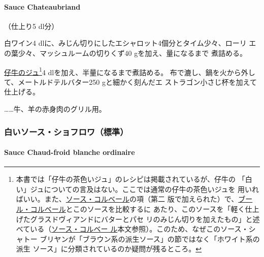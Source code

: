 \begin{recette}
\hypertarget{sauce-chateaubriand}{%
\paragraph{Sauce Chateaubriand}\label{sauce-chateaubriand}}


（仕上り5 dl分）

白ワイン4 dlに、みじん切りにしたエシャロット4個分とタイム少々、ローリ
エの葉少々、マッシュルームの切りくず40 gを加え、\untiers{}量になるまで
煮詰める。

\protect\hyperlink{jus-de-veau-brun}{仔牛のジュ}\footnote{本書では「仔牛の茶色いジュ」のレシピは掲載されているが、仔牛の
  「白い」ジュについての言及はない。ここでは通常の仔牛の茶色いジュを
  用いればいい。また、\protect\hyperlink{sauce-colbert}{ソース・コルベール}の項（第二
  版で加えられた）で、\href{}{ブール・コルベール}とこのソースを比較するに
  あたり、このソースを「軽く仕上げたグラスドヴィアンドにバターとパセ
  リのみじん切りを加えたもの」と述べている（\protect\hyperlink{sauce-colbert}{ソース・コルベー
  ル}本文参照）。このため、なぜこのソース・シャトー
  ブリヤンが「ブラウン系の派生ソース」の節ではなく「ホワイト系の派生
  ソース」に分類されているのか疑問が残るところ。}4
dlを加え、半量になるまで煮詰める。
布で漉し、鍋を火から外して、メートルドテルバター250 gと細かく刻んだエ
ストラゴン小さじ\undemi{}杯を加えて仕上げる。

\ldots{}\ldots{}牛、羊の赤身肉のグリル用。

\maeaki

\hypertarget{ux767dux3044ux30bdux30fcux30b9ux30b7ux30e7ux30d5ux30edux30efux6a19ux6e96}{%
\subsubsection{白いソース・ショフロワ（標準）}\label{ux767dux3044ux30bdux30fcux30b9ux30b7ux30e7ux30d5ux30edux30efux6a19ux6e96}}

\hypertarget{sauce-chaud-froid-blanche-ordinaire}{%
\paragraph{Sauce Chaud-froid blanche
ordinaire}\label{sauce-chaud-froid-blanche-ordinaire}}



\end{recette}
